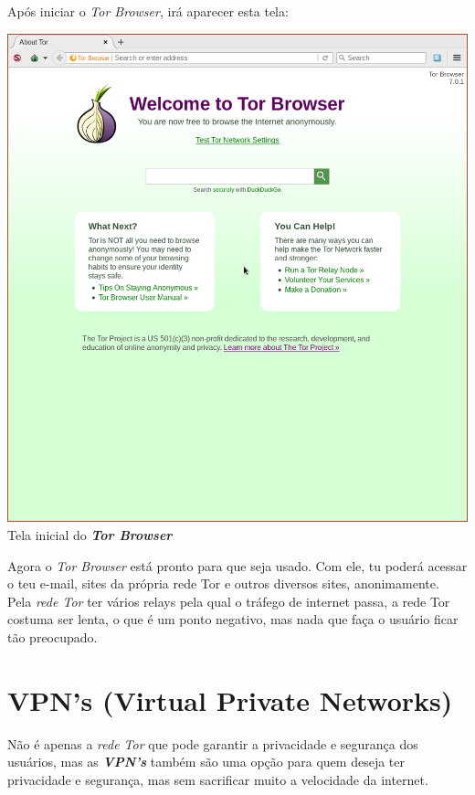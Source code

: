 \documentclass[12pt, letterpaper, Monospace:12]{report}
\begin{document}
\pagebreak

	Após iniciar o \textit{Tor Browser}, irá aparecer esta tela:

	\begin{center}
		\includegraphics[scale=0.55]{tbb3.png}\\
		\footnotesize{Tela inicial do \textbf{\textit{Tor Browser}}}
	\end{center}

	Agora o \textit{Tor Browser} está pronto para que seja usado. Com ele, tu poderá acessar o teu e-mail, sites da própria rede Tor e outros diversos sites, anonimamente.\\

	Pela \textit{rede Tor} ter vários relays pela qual o tráfego de internet passa, a rede Tor costuma ser lenta, o que é um ponto negativo, mas nada que faça o usuário ficar tão preocupado.
\pagebreak

\section{VPN's (Virtual Private Networks)}
	Não é apenas a \textit{rede Tor} que pode garantir a privacidade e segurança dos usuários, mas as \textit{\textbf{VPN's}} também são uma opção para quem deseja ter privacidade e segurança, mas sem sacrificar muito a velocidade da internet.
\end{document}
